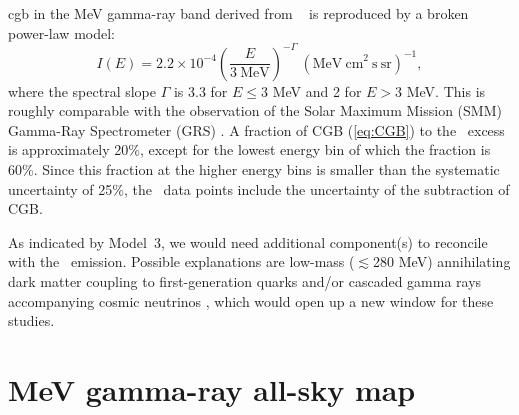 \documentclass[a4paper,11pt]{article}
\begin{document}
\ac{cgb} in the MeV gamma-ray band derived from \comptel\ \citep{weidenspointner_cosmic_2000,kappadath_total_1997,
kappadath_measurement_1998} is reproduced by a broken power-law model:
\begin{equation}
    I(E) = 2.2 \times 10^{-4} \left(\frac{E}{3~\mathrm{MeV}} \right)^{-\Gamma} ~  (\mathrm{MeV ~ cm}^2 ~\mathrm{s ~ sr})^{-1} , 
    \label{eq:CGB}
\end{equation}
where the spectral slope $\Gamma$ is 3.3 for $E \leq 3$ MeV and 2 for $E > 3$ MeV.
This is roughly comparable with the observation of the Solar Maximum Mission (SMM) Gamma-Ray Spectrometer (GRS) \citep{watanabe_mev_2000}. 
A fraction of CGB (\eqref{eq:CGB}) to the \comptel\ excess is approximately 20\%, except for the lowest energy bin of which the fraction is 60\%.
Since this fraction at the higher energy bins is smaller than the systematic uncertainty of 25\%, the \comptel\ data points include the uncertainty of the subtraction of CGB.
\fi


As indicated by Model~3, we would need additional component(s) to reconcile with the \comptel\ emission.
Possible explanations are low-mass ($\lesssim$280 MeV) annihilating dark matter coupling to first-generation quarks \citep{boddy_indirect_2015} and/or 
cascaded gamma rays accompanying cosmic neutrinos \citep{fang_tev_2022},
which would open up a new window for these studies.


\section{MeV gamma-ray all-sky map} \label{sec:allsky}
\end{document}
